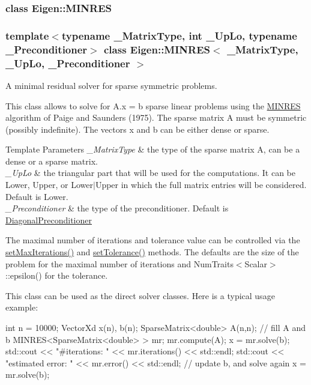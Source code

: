 \label{class_eigen_1_1_m_i_n_r_e_s}
\subsubsection{class Eigen\+:\+:M\+I\+N\+R\+ES}
\subsubsection*{template$<$typename \+\_\+\+Matrix\+Type, int \+\_\+\+Up\+Lo, typename \+\_\+\+Preconditioner$>$\newline
class Eigen\+::\+M\+I\+N\+R\+E\+S$<$ \+\_\+\+Matrix\+Type, \+\_\+\+Up\+Lo, \+\_\+\+Preconditioner $>$}

A minimal residual solver for sparse symmetric problems. 

This class allows to solve for A.\+x = b sparse linear problems using the \hyperlink{group___iterative_linear_solvers___module_class_eigen_1_1_m_i_n_r_e_s}{M\+I\+N\+R\+ES} algorithm of Paige and Saunders (1975). The sparse matrix A must be symmetric (possibly indefinite). The vectors x and b can be either dense or sparse.


\begin{DoxyTemplParams}{Template Parameters}
{\em \+\_\+\+Matrix\+Type} & the type of the sparse matrix A, can be a dense or a sparse matrix. \\
\hline
{\em \+\_\+\+Up\+Lo} & the triangular part that will be used for the computations. It can be Lower, Upper, or Lower$\vert$\+Upper in which the full matrix entries will be considered. Default is Lower. \\
\hline
{\em \+\_\+\+Preconditioner} & the type of the preconditioner. Default is \hyperlink{group___iterative_linear_solvers___module_class_eigen_1_1_diagonal_preconditioner}{Diagonal\+Preconditioner}\\
\hline
\end{DoxyTemplParams}
The maximal number of iterations and tolerance value can be controlled via the \hyperlink{group___iterative_linear_solvers___module_af83de7a7d31d9d4bd1fef6222b07335b}{set\+Max\+Iterations()} and \hyperlink{group___iterative_linear_solvers___module_ac160a444af8998f93da9aa30e858470d}{set\+Tolerance()} methods. The defaults are the size of the problem for the maximal number of iterations and Num\+Traits$<$\+Scalar$>$\+::epsilon() for the tolerance.

This class can be used as the direct solver classes. Here is a typical usage example\+: 
\begin{DoxyCode}
\textcolor{keywordtype}{int} n = 10000;
VectorXd x(n), b(n);
SparseMatrix<double> A(n,n);
\textcolor{comment}{// fill A and b}
MINRES<SparseMatrix<double> > mr;
mr.compute(A);
x = mr.solve(b);
std::cout << \textcolor{stringliteral}{"#iterations:     "} << mr.iterations() << std::endl;
std::cout << \textcolor{stringliteral}{"estimated error: "} << mr.error()      << std::endl;
\textcolor{comment}{// update b, and solve again}
x = mr.solve(b);
\end{DoxyCode}


